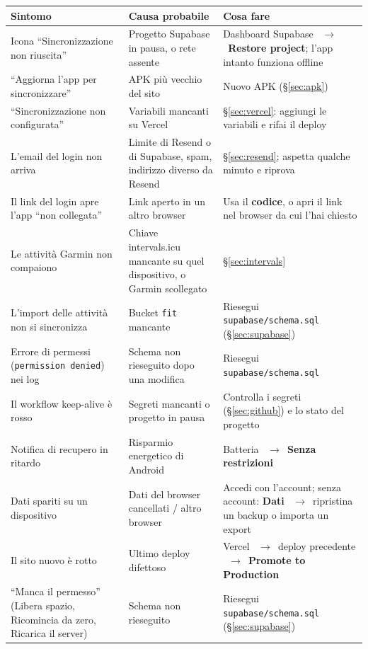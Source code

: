 \documentclass[11pt,a4paper]{article}
\newcommand{\thead}[1]{\textbf{\color{accent}#1}}
\newcommand{\ra}{\unskip\nobreak\ $\rightarrow$\ \ignorespaces}            %
\newcommand{\bt}[1]{\textbf{#1}}               %
\newcommand{\code}[1]{\texttt{#1}}             %
\newcommand{\sezione}[1]{\S\ref{#1}}           %
\begin{document}
{\small
\begin{tabularx}{\textwidth}{L{4.2cm}L{4.4cm}Y}
  \toprule \thead{Sintomo} & \thead{Causa probabile} & \thead{Cosa fare} \\ \midrule
  Icona ``Sincronizzazione non riuscita'' & Progetto Supabase in pausa, o rete assente &
    Dashboard Supabase \ra \bt{Restore project}; l'app intanto funziona offline \\
  ``Aggiorna l'app per sincronizzare'' & APK più vecchio del sito &
    Nuovo APK (\sezione{sec:apk}) \\
  ``Sincronizzazione non configurata'' & Variabili mancanti su Vercel &
    \sezione{sec:vercel}: aggiungi le variabili e rifai il deploy \\
  L'email del login non arriva & Limite di Resend o di Supabase, spam,
    indirizzo diverso da Resend & \sezione{sec:resend}; aspetta qualche minuto e riprova \\
  Il link del login apre l'app ``non collegata'' & Link aperto in un altro browser &
    Usa il \bt{codice}, o apri il link nel browser da cui l'hai chiesto \\
  Le attività Garmin non compaiono & Chiave intervals.icu mancante su quel
    dispositivo, o Garmin scollegato & \sezione{sec:intervals} \\
  L'import delle attività non si sincronizza & Bucket \code{fit} mancante &
    Riesegui \code{supabase/schema.sql} (\sezione{sec:supabase}) \\
  Errore di permessi (\code{permission denied}) nei log &
    Schema non rieseguito dopo una modifica & Riesegui \code{supabase/schema.sql} \\
  Il workflow keep-alive è rosso & Segreti mancanti o progetto in pausa &
    Controlla i segreti (\sezione{sec:github}) e lo stato del progetto \\
  Notifica di recupero in ritardo & Risparmio energetico di Android &
    Batteria \ra \bt{Senza restrizioni} \\
  Dati spariti su un dispositivo & Dati del browser cancellati / altro browser &
    Accedi con l'account; senza account: \bt{Dati} \ra ripristina un backup o importa un export \\
  Il sito nuovo è rotto & Ultimo deploy difettoso &
    Vercel \ra deploy precedente \ra \bt{Promote to Production} \\
  ``Manca il permesso'' (Libera spazio, Ricomincia da zero, Ricarica il server) &
    Schema non rieseguito & Riesegui \code{supabase/schema.sql} (\sezione{sec:supabase}) \\

\end{tabularx}}
\end{document}
